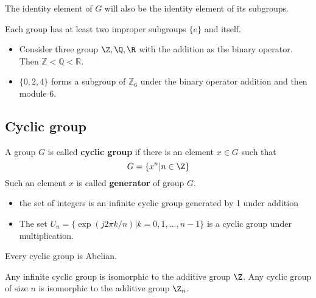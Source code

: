 \begin{refsection}
\begin{remark}
The identity element of $G$ will also be the identity element of its subgroups. 
\end{remark}

\begin{remark}
Each group has at least two improper subgroups $\{e\}$ and itself.
\end{remark}


\begin{example}\hfill
\begin{itemize}
    \item Consider three group $\Z,\Q,\R$ with the addition as the binary operator. Then $\mathbb{Z} < \mathbb{Q} < \mathbb{R}$.
    \item $\{0,2,4\}$ forms a subgroup of $\mathbb{Z}_6$ under the binary operator addition and then module 6.
\end{itemize}
\end{example}

\subsection{Cyclic group}
\begin{definition}
	A group $G$ is called \textbf{cyclic group} if there is an element $x\in G$ such that
	$$G = \{x^n|n\in \Z \}$$
	Such an element $x$ is called\textbf{ generator} of group $G$.
\end{definition}

\begin{example}\hfill
	\begin{itemize}
		\item the set of integers is an infinite cyclic group generated by 1 under addition
		\item The set $U_n=\{\exp(j2\pi k/n)| k=0,1,...,n-1\}$ is a cyclic group under multiplication.
	\end{itemize}
\end{example}

\begin{lemma}
	Every cyclic group is Abelian.
\end{lemma}


\begin{theorem}
	Any infinite cyclic group is isomorphic to the additive group $\Z$. Any cyclic group of size $n$ is isomorphic to the additive group $\Z_n$.
\end{theorem}


\end{refsection}
